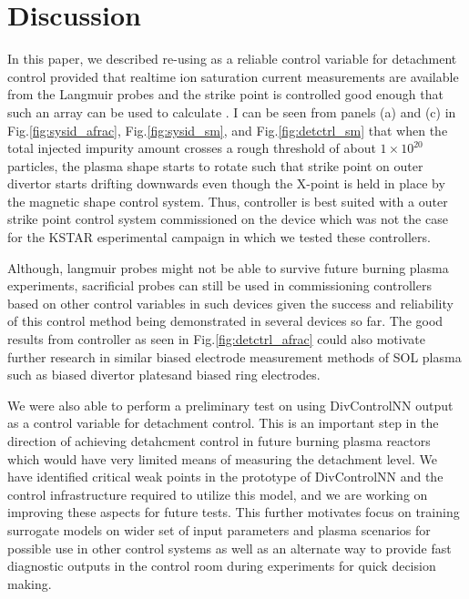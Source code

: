\section{Discussion}
\label{sec:discussion}

In this paper, we described re-using \Afrac as a reliable control variable for detachment control provided that realtime ion saturation current measurements are available from the Langmuir probes and the strike point is controlled good enough that such an array can be used to calculate \Afrac.
I can be seen from panels (a) and (c) in Fig.\ref{fig:sysid_afrac}, Fig.\ref{fig:sysid_sm}, and Fig.\ref{fig:detctrl_sm} that when the total injected impurity amount crosses a rough threshold of about $1\times10^{20}$ particles, the plasma shape starts to rotate such that strike point on outer divertor starts drifting downwards even though the X-point is held in place by the magnetic shape control system.
Thus, \Afrac controller is best suited with a outer strike point control system commissioned on the device which was not the case for the KSTAR esperimental campaign in which we tested these controllers.

Although, langmuir probes might not be able to survive future burning plasma experiments, sacrificial probes can still be used in commissioning controllers based on other control variables in such devices given the success and reliability of this control method being demonstrated in several devices so far\needcite.
The good results from \Afrac controller as seen in Fig.\ref{fig:detctrl_afrac} could also motivate further research in similar biased electrode measurement methods of SOL plasma such as biased divertor plates\needcite and biased ring electrodes\needcite.

We were also able to perform a preliminary test on using DivControlNN output as a control variable for detachment control.
This is an important step in the direction of achieving detahcment control in future burning plasma reactors which would have very limited means of measuring the detachment level.
We have identified critical weak points in the prototype of DivControlNN and the control infrastructure required to utilize this model, and we are working on improving these aspects for future tests.
This further motivates focus on training surrogate models on wider set of input parameters and plasma scenarios for possible use in other control systems as well as an alternate way to provide fast diagnostic outputs in the control room during experiments for quick decision making.

